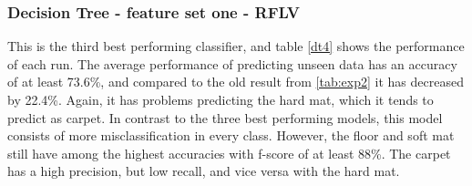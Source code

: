 \documentclass[USenglish]{ifimaster}  %
\begin{document}
\subsubsection{Decision Tree - feature set one - RFLV}
This is the third best performing classifier, and table \ref{dt4} shows the performance of each run. The average performance of predicting unseen data has an accuracy of at least 73.6\%, and compared to the old result from \ref{tab:exp2} it has decreased by 22.4\%. Again, it has problems predicting the hard mat, which it tends to predict as carpet. In contrast to the three best performing models, this model consists of more misclassification in every class. However, the floor and soft mat still have among the highest accuracies with f-score of at least 88\%. The carpet has a high precision, but low recall, and vice versa with the hard mat.
\end{document}
